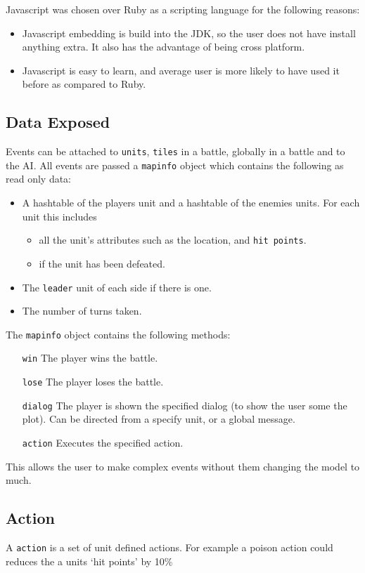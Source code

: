 \noindent Javascript was chosen over Ruby as a scripting language for the following reasons:
\begin{itemize}
	\item Javascript embedding is build into the JDK, so the user does not have install anything extra. It also has the advantage of being cross platform. 
	\item Javascript is easy to learn, and average user is more likely to have used it before as compared to Ruby.
\end{itemize}

\subsection{Data Exposed}
	Events can be attached to \texttt{units}, \texttt{tiles} in a battle, globally in a battle and to the AI.
All events are passed a \texttt{mapinfo} object which contains the following as read only data:
\begin{itemize}
	\item A hashtable of the players unit and a hashtable of the enemies units. For each unit this includes 
		\begin{itemize}
			\item all the unit's attributes such as the location, and \texttt{hit points}. 
			\item if the unit has been defeated. 
		\end{itemize}
	\item The \texttt{leader} unit of each side if there is one.
	\item The number of turns taken.
\end{itemize}
The \texttt{mapinfo}  object contains the following methods:
\begin{itemize}
	\item[\texttt{win}]     The player wins the battle.
	\item[\texttt{lose}]    The player loses the battle.
	\item[\texttt{dialog}]  The player is shown the specified dialog (to show the user some the plot). Can be directed from a specify unit, or a global message.
	\item[\texttt{action}]   Executes the specified action.
\end{itemize}

This allows the user to make complex events without them changing the model to much.

\subsection{Action}
A \texttt{action} is a set of unit defined actions. For example a poison action could reduces the a units `hit points' by 10\% 

